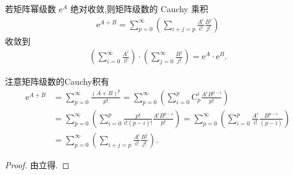 \documentclass[../../main.tex]{subfiles}
\begin{document}
\begin{corollary}\label{corollary:矩阵幂级数的绝对收敛性保证了Cauchy乘积的收敛性}
若矩阵幂级数 $\mathrm{e}^A$ 绝对收敛,则矩阵级数的 Cauchy 乘积
\begin{align*}
\mathrm{e}^{A + B}=\sum_{p = 0}^{\infty}\left(\sum_{i + j = p}\frac{A^i}{i!}\frac{B^j}{j!}\right)
\end{align*}
收敛到
\begin{align*}
\left(\sum_{i = 0}^{\infty}\frac{A^i}{i!}\right)\cdot\left(\sum_{j = 0}^{\infty}\frac{B^j}{j!}\right)=\mathrm{e}^A\cdot\mathrm{e}^B.
\end{align*}
\end{corollary}
\begin{remark}
注意矩阵级数的Cauchy积有
\begin{align*}
\mathrm{e}^{A+B}&=\sum_{p=0}^{\infty}{\frac{\left( A+B \right) ^p}{p!}}=\sum_{p=0}^{\infty}{\left( \sum_{i=0}^p{\mathrm{C}_{p}^{i}\frac{A^iB^{p-i}}{p!}} \right)}
\\
&=\sum_{p=0}^{\infty}{\left( \sum_{i=0}^p{\frac{p!}{i!\left( p-i \right) !}\frac{A^iB^{p-i}}{p!}} \right)}=\sum_{p=0}^{\infty}{\left( \sum_{i=0}^p{\frac{A^i}{i!}\frac{B^{p-i}}{\left( p-i \right)}} \right)}
\\
&=\sum_{p=0}^{\infty}{\left( \sum_{i+j=p}{\frac{A^i}{i!}\frac{B^j}{j!}} \right)}.
\end{align*}
\end{remark}
\begin{proof}
由立得.
\end{proof}
\end{document}
